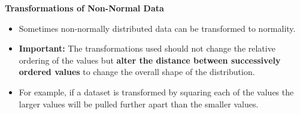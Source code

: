 \documentclass{beamer}
\begin{document}
\begin{frame}
\textbf{Transformations of Non-Normal Data} 
\Large
\begin{itemize}
\item Sometimes non-normally distributed data can be transformed to normality.

\item \textbf{Important:} The transformations used should not change the relative ordering of the values but \textbf{alter the distance between successively ordered values }to change the overall shape of the distribution.

\item For example, if a dataset is transformed by squaring each of the values the larger values will be pulled further apart than the smaller values.
\end{itemize}

\end{frame}
%
\end{document}
